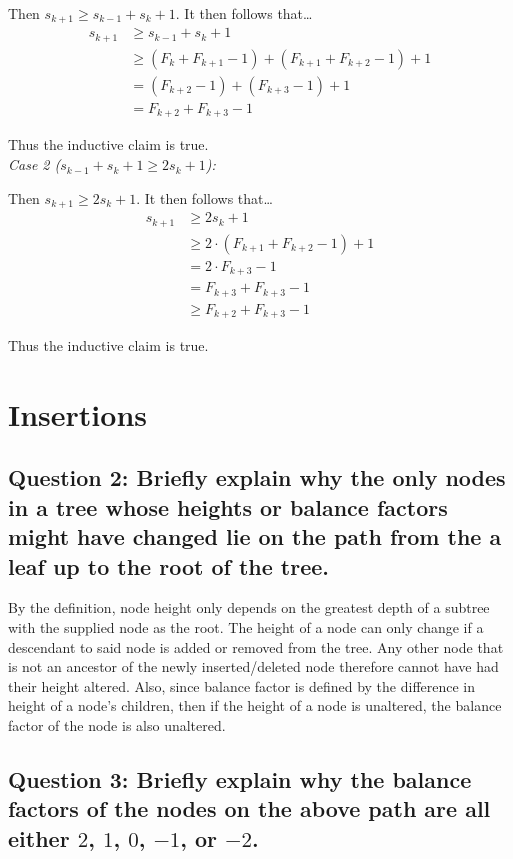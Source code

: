\documentclass[a4paper, 12pt, titlepage]{article}
\begin{document}
Then $s_{k+1} \geq s_{k-1} + s_k + 1$.
It then follows that\ldots
\begin{align*}
s_{k+1}	& \geq s_{k-1} + s_{k} + 1\\
		& \geq (F_k + F_{k+1} - 1) + (F_{k+1} + F_{k+2} - 1) + 1 \tag*{(By the I.H.)}\\
		& = (F_{k+2} - 1) + (F_{k+3} - 1) + 1\\
		& = F_{k+2} + F_{k+3} - 1
\end{align*}

Thus the inductive claim is true.\\

\newpage
\noindent
\textit{Case 2 ($s_{k-1} + s_{k} + 1 \geq 2s_k + 1$):}

Then $s_{k+1} \geq  2s_k + 1$.
It then follows that\ldots
\begin{align*}
s_{k+1}	& \geq 2s_k + 1\\
		& \geq 2 \cdot (F_{k+1} + F_{k+2} - 1) + 1 \tag*{(By the I.H.)}\\
		& = 2 \cdot F_{k+3} - 1\\
		& = F_{k+3} + F_{k+3} - 1\\
		& \geq F_{k+2} + F_{k+3} - 1
\end{align*}

Thus the inductive claim is true.

\section*{Insertions}

\subsection*{Question 2: Briefly explain why the only nodes in a tree whose heights or balance factors might
have changed lie on the path from the a leaf up to the root of the tree.} 

By the definition,
node height only depends on the greatest depth of a subtree with the supplied node as the root.
The height of a node can only change if a descendant to said node is added or removed from the tree.
Any other node that is not an ancestor of the newly inserted/deleted node therefore cannot have had their height altered.
Also,
since balance factor is defined by the difference in height of a node's children,
then if the height of a node is unaltered,
the balance factor of the node is also unaltered.

\subsection*{Question 3: Briefly explain why the balance factors of the nodes on the above path are all either $2$, $1$, $0$, $-1$, or $-2$.} 
\end{document}
